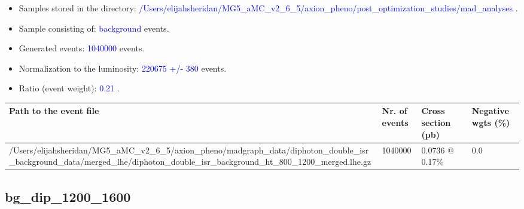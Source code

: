 \documentclass[a4paper, 10pt]{article}
\begin{document}
\begin{itemize}
  \item Samples stored in the directory: \textcolor{blue}{/\-Users/\-elijahsheridan/\-MG5\_aMC\_v2\_6\_5/\-axion\_pheno/\-post\_optimization\_studies/\-mad\_analyses} .
   \item Sample consisting of: \textcolor{blue}{background}  events.
   \item Generated events: \textcolor{blue}{1040000 }  events.
   \item Normalization to the luminosity: \textcolor{blue}{220675}\textcolor{blue}{ +/\-- }\textcolor{blue}{380 }  events.
   \item Ratio (event weight): \textcolor{blue}{0.21 } .  
 
\end{itemize}
\begin{table}[H]
  \begin{center}
    \begin{tabular}{|m{55.0mm}|m{25.0mm}|m{30.0mm}|m{30.0mm}|}
      \hline
      {\cellcolor{yellow}         Path to the event file}& {\cellcolor{yellow}         Nr. of events}& {\cellcolor{yellow}         Cross section (pb)}& {\cellcolor{yellow}         Negative wgts (\%)}\\
      \hline
      {\cellcolor{white}          /\-Users/\-elijahsheridan/\-MG5\_aMC\_v2\_6\_5/\-axion\_pheno/\-madgraph\_data/\-diphoton\_double\_isr\_background\_data/\-merged\_lhe/\-diphoton\_double\_isr\_background\_ht\_800\_1200\_merged.lhe.gz}& {\cellcolor{white}          1040000}& {\cellcolor{white}          0.0736 @ 0.17\%}& {\cellcolor{white}          0.0}\\
\hline
    \end{tabular}
  \end{center}
\end{table}

\subsection{ bg\_dip\_1200\_1600}
\end{document}
